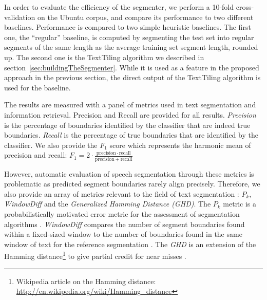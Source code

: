 In order to evaluate the efficiency of the segmenter, we perform a 10-fold cross-validation on the Ubuntu corpus, and compare its performance to two different baselines. 
%
Performance is compared to two simple heuristic baselines. The first one, the ``regular'' baseline, is computed by segmenting the test set into regular segments of the same length as the average training set segment length, rounded up. The second one is the TextTiling algorithm we described in section~\ref{sec:buildingTheSegmenter}.
While it is used as a feature in the proposed approach in the previous section, the direct output of the TextTiling algorithm is used for the baseline.


The results are measured with a panel of metrics used in text segmentation and information retrieval.
%
Precision and Recall are provided for all results. \textit{Precision} is the percentage of boundaries identified by the classifier that are indeed true boundaries. \textit{Recall} is the percentage of true boundaries that are identified by the classifier. We also provide the $F_1$ score which represents the harmonic mean of precision and recall:
$  F_1 = 2 \cdot \frac{\mathrm{precision} \cdot \mathrm{recall}}{\mathrm{precision} + \mathrm{recall}}$

However, automatic evaluation of speech segmentation through these metrics is problematic as predicted segment boundaries rarely align precisely. 
Therefore, %
 we also provide an array of metrics relevant to the field of text segmentation : ${P_{k}}$, \textit{WindowDiff} and the \textit{Generalized Hamming Distance (GHD)}.
%
The ${P_{k}}$ metric is a probabilistically motivated error metric for the assessment of segmentation algorithms \cite{beeferman1999statistical}.
%
\textit{WindowDiff} compares the number of segment boundaries found within a fixed-sized window to the number of boundaries found in the same window of text for the reference segmentation \cite{pevzner2002critique}.
%
The \textit{GHD} is an extension of the Hamming distance\footnote{Wikipedia article on the Hamming distance: \url{http://en.wikipedia.org/wiki/Hamming_distance}} to give partial credit for near misses \cite{bookstein2002generalized}.


